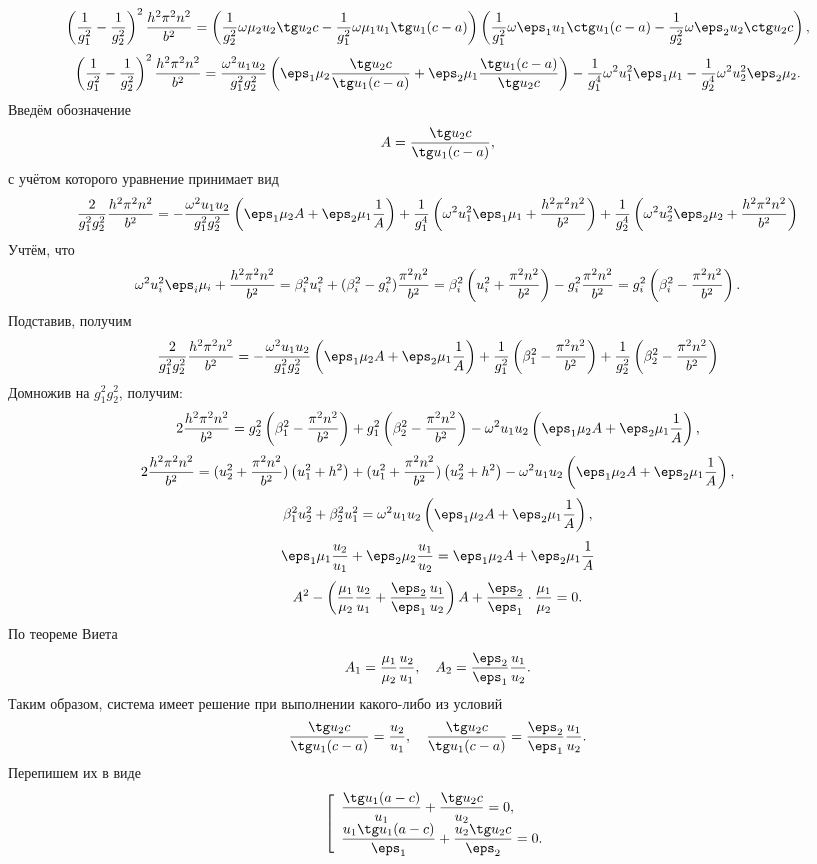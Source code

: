 \documentclass[a4paper]{article}
\renewcommand{\frac}{\dfrac}
\begin{document}
\[
    \left( \frac{1}{g_1^2} - \frac{1}{g_2^2} \right)^2\frac{h^2\pi^2n^2}{b^2}=
    \left(\frac{1}{g_2^2}\omega\mu_2u_2\tg u_2 c-
    \frac{1}{g_1^2}\omega\mu_1u_1\tg u_1 (c-a)\right)
    \left(\frac{1}{g_1^2}\omega\eps_1u_1\ctg u_1 (c-a)-
    \frac{1}{g_2^2}\omega\eps_2u_2\ctg u_2 c\right),
\]
\[
    \left( \frac{1}{g_1^2} - \frac{1}{g_2^2} \right)^2\frac{h^2\pi^2n^2}{b^2}=
    \frac{\omega^2u_1u_2}{g_1^2g_2^2}\left(\eps_1\mu_2\frac{\tg u_2 c}{\tg u_1
    (c-a)} + \eps_2\mu_1\frac{\tg u_1 (c-a)}{\tg u_2 c}\right) -\frac{1}{g_1^4}
    \omega^2u_1^2\eps_1\mu_1 - \frac{1}{g_2^4}\omega^2u_2^2\eps_2\mu_2.
\]
Введём обозначение
\[
    A = \frac{\tg u_2 c}{\tg u_1 (c-a)},
\]
с учётом которого уравнение принимает вид
\[
    \frac{2}{g_1^2 g_2^2}\frac{h^2\pi^2n^2}{b^2} =
    -\frac{\omega^2u_1u_2}{g_1^2g_2^2}\left(\eps_1\mu_2 A +
    \eps_2\mu_1\frac{1}{A}\right) +
    \frac{1}{g_1^4}
    \left(\omega^2u_1^2\eps_1\mu_1 + \frac{h^2\pi^2n^2}{b^2}\right) +
    \frac{1}{g_2^4}
    \left(\omega^2u_2^2\eps_2\mu_2 + \frac{h^2\pi^2n^2}{b^2}\right)
\]
Учтём, что
\[
    \omega^2u_i^2\eps_i\mu_i + \frac{h^2\pi^2n^2}{b^2} = \beta_i^2u_i^2 +
    (\beta_i^2 - g_i^2)\frac{\pi^2n^2}{b^2} =
    \beta_i^2\left( u_i^2 + \frac{\pi^2n^2}{b^2} \right) -
    g_i^2\frac{\pi^2n^2}{b^2} =
    g_i^2\left( \beta_i^2 - \frac{\pi^2n^2}{b^2}\right).
\]
Подставив, получим
\[
    \frac{2}{g_1^2 g_2^2}\frac{h^2\pi^2n^2}{b^2} =
    -\frac{\omega^2u_1u_2}{g_1^2g_2^2}\left(\eps_1\mu_2 A +
    \eps_2\mu_1\frac{1}{A}\right) +
    \frac{1}{g_1^2}
    \left(\beta_1^2 - \frac{\pi^2n^2}{b^2}\right) +
    \frac{1}{g_2^2}
    \left(\beta_2^2 - \frac{\pi^2n^2}{b^2}\right)
\]
Домножив на \( g_1^2g_2^2 \), получим:
\[
    2\frac{h^2\pi^2n^2}{b^2} = g_2^2
    \left(\beta_1^2 - \frac{\pi^2n^2}{b^2}\right) +
    g_1^2\left(\beta_2^2 - \frac{\pi^2n^2}{b^2}\right)-
    \omega^2u_1u_2\left(\eps_1\mu_2 A +
    \eps_2\mu_1\frac{1}{A}\right),
\]
\[
    2\frac{h^2\pi^2n^2}{b^2} = (u_2^2 + \frac{\pi^2n^2}{b^2})
    \left(u_1^2+h^2\right) +
    (u_1^2 + \frac{\pi^2n^2}{b^2})\left(u_2^2 + h^2\right)-
    \omega^2u_1u_2\left(\eps_1\mu_2 A +
    \eps_2\mu_1\frac{1}{A}\right),
\]
\[
    \beta_1^2u_2^2 + \beta_2^2u_1^2=
    \omega^2u_1u_2\left(\eps_1\mu_2 A +
    \eps_2\mu_1\frac{1}{A}\right),
\]
\[
    \eps_1\mu_1\frac{u_2}{u_1} + \eps_2\mu_2\frac{u_1}{u_2} =
    \eps_1\mu_2 A + \eps_2\mu_1\frac{1}{A}
\]
\[
    A^2 - \left(
    \frac{\mu_1}{\mu_2}\frac{u_2}{u_1} + \frac{\eps_2}{\eps_1}\frac{u_1}{u_2}
    \right)A + \frac{\eps_2}{\eps_1}\cdot\frac{\mu_1}{\mu_2} = 0.
\]
По теореме Виета
\[
    A_1 = \frac{\mu_1}{\mu_2}\frac{u_2}{u_1},\quad
    A_2 = \frac{\eps_2}{\eps_1}\frac{u_1}{u_2}.
\]
Таким образом, система имеет решение при выполнении какого-либо из условий
\[
    \frac{\tg u_2 c}{\tg u_1 (c-a)} =
    \frac{u_2}{u_1},\quad
    \frac{\tg u_2 c}{\tg u_1 (c-a)} =
    \frac{\eps_2}{\eps_1}\frac{u_1}{u_2}.
\]
Перепишем их в виде
\[
    \left[
        \begin{array}{l}
            \frac{\tg u_1 (a-c)}{u_1} + \frac{\tg u_2 c}{u_2} = 0,\\
            \frac{u_1\tg u_1 (a-c)}{\eps_1} + \frac{u_2\tg u_2 c}{\eps_2} = 0.
        \end{array}
    \right.
\]
\end{document}
